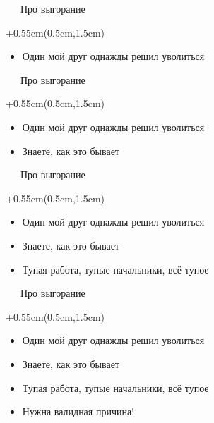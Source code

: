 \documentclass[xetex,18pt,aspectratio=169]{beamer}
\begin{document}
\begin{Large}
\begin{frame}{\ \ \ Про выгорание}
\begin{textblock*}{\framewidth+0.55cm}(0.5cm,1.5cm)
\begin{itemize}
  \item Один мой друг однажды решил уволиться
\end{itemize}
\end{textblock*}
\end{frame}

\begin{frame}{\ \ \ Про выгорание}
\begin{textblock*}{\framewidth+0.55cm}(0.5cm,1.5cm)
\begin{itemize}
  \item Один мой друг однажды решил уволиться
  \item Знаете, как это бывает
\end{itemize}
\end{textblock*}
\end{frame}

\begin{frame}{\ \ \ Про выгорание}
\begin{textblock*}{\framewidth+0.55cm}(0.5cm,1.5cm)
\begin{itemize}
  \item Один мой друг однажды решил уволиться
  \item Знаете, как это бывает
  \item Тупая работа, тупые начальники, всё тупое
\end{itemize}
\end{textblock*}
\end{frame}

\begin{frame}{\ \ \ Про выгорание}
\begin{textblock*}{\framewidth+0.55cm}(0.5cm,1.5cm)
\begin{itemize}
  \item Один мой друг однажды решил уволиться
  \item Знаете, как это бывает
  \item Тупая работа, тупые начальники, всё тупое
  \item Нужна валидная причина!
\end{itemize}
\end{textblock*}
\end{frame}


\end{Large}
\end{document}
